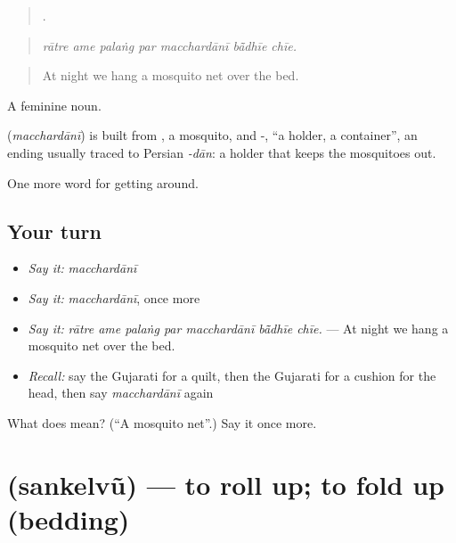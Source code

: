 \begin{quote}
      .
\end{quote}

\begin{quote}
\emph{rātre ame palaṅg par macchardānī bā̃dhīe chīe.}
\end{quote}

\begin{quote}
At night we hang a mosquito net over the bed.
\end{quote}

A feminine noun.

\begin{cousinweb}
\textbf{} (\emph{macchardānī}) is built from , a mosquito, and -, \textquotedblleft{}a holder, a container\textquotedblright{}, an ending usually traced to Persian \emph{-dān}: a holder that keeps the mosquitoes out.
\end{cousinweb}

\begin{grammarlens}[title={What you've built}]
One more word for getting around.
\end{grammarlens}

\subsection*{Your turn}
\begin{itemize}
\raggedright
  \item \emph{Say it:} \emph{macchardānī}
  \item \emph{Say it:} \emph{macchardānī}, once more
  \item \emph{Say it:} \emph{rātre ame palaṅg par macchardānī bā̃dhīe chīe.} — At night we hang a mosquito net over the bed.
  \item \emph{Recall:} say the Gujarati for a quilt, then the Gujarati for a cushion for the head, then say \emph{macchardānī} again
\end{itemize}

\begin{tcolorbox}[breakable,colback=teal!4,colframe=teal!35!black,title={Before you move on}]
What does  mean? (\textquotedblleft{}A mosquito net\textquotedblright{}.) Say it once more.
\end{tcolorbox}
\section[\texorpdfstring{\gu{સંકેલવું} (sankelvũ)}{સંકેલવું (sankelvũ)}]{ (sankelvũ) — to roll up; to fold up (bedding)}

